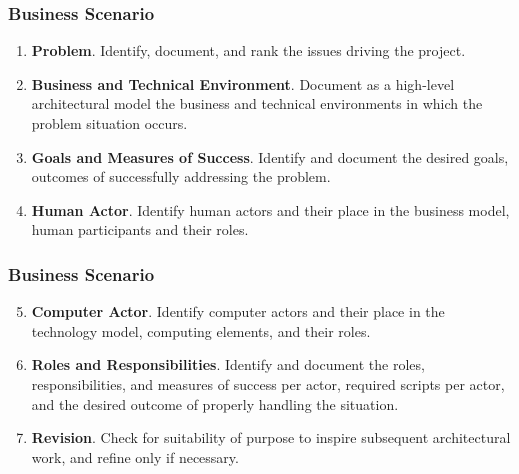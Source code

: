 \documentclass[aspectratio=169, table]{beamer}
\begin{document}
    \begin{frame}
        \frametitle{Business Scenario}
        \begin{enumerate}
            \item \textbf{Problem}.
            Identify, document, and rank the issues driving the project.
            \item \textbf{Business and Technical Environment}.
            Document as a high-level architectural model the business and technical environments in which the problem situation occurs.
            \item \textbf{Goals and Measures of Success}.
            Identify and document the desired goals, outcomes of successfully addressing the problem.
            \item \textbf{Human Actor}.
            Identify human actors and their place in the business model, human participants and their roles.

        \end{enumerate}
    \end{frame}

    \begin{frame}
        \frametitle{Business Scenario}
        \begin{enumerate}
            \setcounter{enumi}{4}
            \item \textbf{Computer Actor}.
            Identify computer actors and their place in the technology model, computing elements, and their roles.
            \item \textbf{Roles and Responsibilities}.
            Identify and document the roles, responsibilities, and measures of success per actor, required scripts per actor, and the desired outcome of properly handling the situation.
            \item \textbf{Revision}.
            Check for suitability of purpose to inspire subsequent architectural work, and refine only if necessary.
        \end{enumerate}
    \end{frame}
\end{document}
